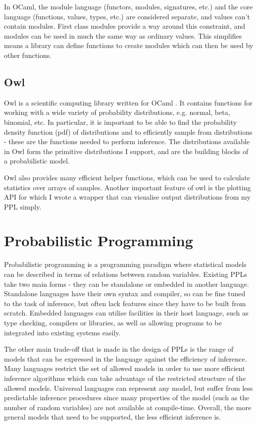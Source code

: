 In OCaml, the module language (functors, modules, signatures, etc.) and the core language (functions, values, types, etc.) are considered separate, and values can't contain modules. First class modules provide a way around this constraint, and modules can be used in much the same way as ordinary values. This simplifies means a library can define functions to create modules which can then be used by other functions.
	
\subsection{Owl}
		
Owl is a scientific computing library written for OCaml \cite{owl}. It contains functions for working with a wide variety of probability distributions, e.g. normal, beta, binomial, etc. In particular, it is important to be able to find the probability density function (pdf) of distributions and to efficiently sample from distributions - these are the functions needed to perform inference. The distributions available in Owl form the primitive distributions I support, and are the building blocks of a probabilistic model.
	
Owl also provides many efficient helper functions, which can be used to calculate statistics over arrays of samples. Another important feature of owl is the plotting API for which I wrote a wrapper that can visualise output distributions from my PPL simply.
	
\section{Probabilistic Programming}
Probabilistic programming is a programming paradigm where statistical models can be described in terms of relations between random variables. Existing PPLs take two main forms - they can be standalone or embedded in another language. Standalone languages have their own syntax and compiler, so can be fine tuned to the task of inference, but often lack features since they have to be built from scratch. Embedded languages can utilise facilities in their host language, such as type checking, compilers or libraries, as well as allowing programs to be integrated into existing systems easily.
	
The other main trade-off that is made in the design of PPLs is the range of models that can be expressed in the language against the efficiency of inference. Many languages restrict the set of allowed models in order to use more efficient inference algorithms which can take advantage of the restricted structure of the allowed models. Universal languages can represent any model, but suffer from less predictable inference procedures since many properties of the model (such as the number of random variables) are not available at compile-time. Overall, the more general models that need to be supported, the less efficient inference is.
	
